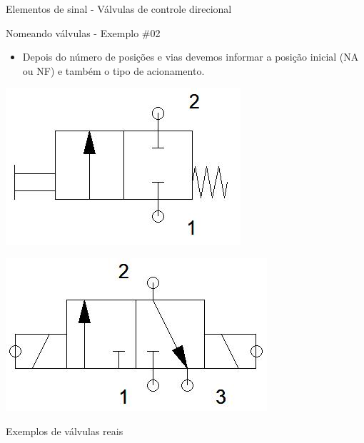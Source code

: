 \begin{frame}{Elementos de sinal - Válvulas de controle direcional}
	\begin{block}{Nomeando válvulas - Exemplo \#02}
		\begin{itemize}
			\item Depois do número de posições e vias devemos informar a posição inicial (NA ou NF) e também o tipo de acionamento.
		\end{itemize}
	\end{block}
	
	\medskip
	
	\begin{minipage}[c]{0.48\linewidth}
		\centering
		\includegraphics[width=1\linewidth]{Figuras/Ch14/fig19}
	\end{minipage}
	\hfill
	\begin{minipage}[c]{0.48\linewidth}
		\centering
		\includegraphics[width=1\linewidth]{Figuras/Ch14/fig20}
	\end{minipage}

	\centering
	\medskip
	
	Exemplos de válvulas reais
\end{frame}


